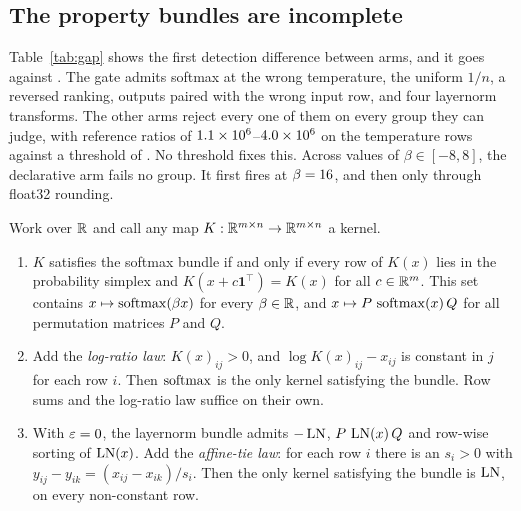 \subsection{The property bundles are incomplete}
\label{sec:incomplete}

Table~\ref{tab:gap} shows the first detection difference between arms, and it goes
against \DeclArm. The gate admits softmax at the wrong temperature, the uniform $1/n$, a
reversed ranking, outputs paired with the wrong input row, and four layernorm
transforms. The other arms reject every one of them on every group they can judge, with
reference ratios of $1.1\times10^{6}$--$4.0\times10^{6}$ on the temperature rows against a
threshold of . No threshold fixes this. Across \betaSweepValues{} values of
$\beta \in [-8,8]$, the declarative arm fails no group. It first fires at
$\beta = 16$, and then only through float32 rounding.

\begin{proposition}
\label{prop:softmax}
Work over $\mathbb{R}$ and call any map $K:\mathbb{R}^{m\times n}\to\mathbb{R}^{m\times n}$ a kernel.
\begin{enumerate}
  \item[(a)] $K$ satisfies the softmax bundle if and only if every row of $K(x)$ lies in
    the probability simplex and $K(x + c\mathbf 1^\top) = K(x)$ for all $c\in\mathbb{R}^m$. This set
    contains $x \mapsto \operatorname{softmax}(\beta x)$ for every $\beta\in\mathbb{R}$, and
    $x \mapsto P\,\operatorname{softmax}(x)\,Q$ for all permutation matrices $P$ and $Q$.
  \item[(b)] Add the \emph{log-ratio law}: $K(x)_{ij} > 0$, and
    $\log K(x)_{ij} - x_{ij}$ is constant in $j$ for each row $i$. Then $\operatorname{softmax}$ is
    the only kernel satisfying the bundle. Row sums and the log-ratio law suffice on
    their own.
  \item[(c)] With $\varepsilon = 0$, the layernorm bundle admits $-\operatorname{LN}$, $P\,\operatorname{LN}(x)\,Q$ and
    row-wise sorting of $\operatorname{LN}(x)$. Add the \emph{affine-tie law}: for each row $i$ there is
    an $s_i > 0$ with $y_{ij} - y_{ik} = (x_{ij} - x_{ik})/s_i$. Then the only kernel
    satisfying the bundle is $\operatorname{LN}$, on every non-constant row.
\end{enumerate}
\end{proposition}

